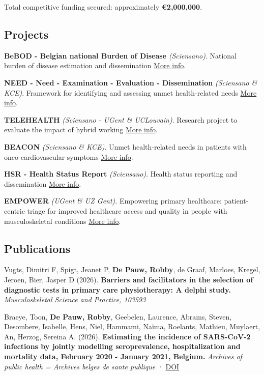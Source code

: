 \documentclass[
  letterpaper,
  DIV=11,
  numbers=noendperiod]{scrartcl}
\begin{document}
Total competitive funding secured: approximately \textbf{€2,000,000}.

\subsection{Projects}\label{projects}

\textbf{BeBOD - Belgian national Burden of Disease} \emph{(Sciensano)}.
National burden of disease estimation and dissemination
\href{https://burden.sciensano.be}{More info}.

\textbf{NEED - Need - Examination - Evaluation - Dissemination}
\emph{(Sciensano \& KCE)}. Framework for identifying and assessing unmet
health-related needs \href{https://www.unmet-needs.eu}{More info}.

\textbf{TELEHEALTH} \emph{(Sciensano - UGent \& UCLouvain)}. Research
project to evaluate the impact of hybrid working
\href{https://weave-telehealth.be}{More info}.

\textbf{BEACON} \emph{(Sciensano \& KCE)}. Unmet health-related needs in
patients with onco-cardiovascular symptoms
\href{https://example.com}{More info}.

\textbf{HSR - Health Status Report} \emph{(Sciensano)}. Health status
reporting and dissemination \href{https://www.unmet-needs.eu}{More
info}.

\textbf{EMPOWER} \emph{(UGent \& UZ Gent)}. Empowering primary
healthcare: patient-centric triage for improved healthcare access and
quality in people with musculoskeletal conditions
\href{https://www.ugent.be/ge/reva/nl}{More info}.

\subsection{Publications}\label{publications}

Vugts, Dimitri F, Spigt, Jeanet P, \textbf{De Pauw, Robby}, de Graaf,
Marloes, Kregel, Jeroen, Bier, Jasper D (2026). \textbf{Barriers and
facilitators in the selection of diagnostic tests in primary care
physiotherapy: A delphi study.} \emph{Musculoskeletal Science and
Practice, 103593}

Braeye, Toon, \textbf{De Pauw, Robby}, Geebelen, Laurence, Abrams,
Steven, Desombere, Isabelle, Hens, Niel, Hammami, Naïma, Roelants,
Mathieu, Muylaert, An, Herzog, Sereina A. (2026). \textbf{Estimating the
incidence of SARS-CoV-2 infections by jointly modelling seroprevalence,
hospitalization and mortality data, February 2020 - January 2021,
Belgium.} \emph{Archives of public health = Archives belges de sante
publique} · \href{https://doi.org/10.1186/s13690-026-01860-z}{DOI}
\end{document}
